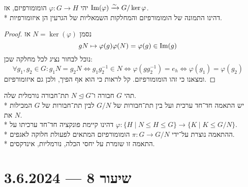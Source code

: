 \begin{theorem}
	יהי $\varphi : G \to H$ הומומורפיזם, אז $\operatorname{Im}(\varphi) \xrightarrow{\sim} G/\ker{\varphi}$. \\*
	דהינו התמונה של הומומורפיזם והמחלקות השמאליות של הגרעין הן איזומורפיות.
\end{theorem}
\begin{proof}
	נסמן $N = \ker(\varphi)$ אז
	\[
		g N \mapsto \varphi(g) \varphi(N) = \varphi(g) \in \operatorname{Im}(g)
	\]
	נוכל לבחור נציג לכל מחלקה שכן:
	\[
		\forall g_1, g_2 \in G : g_1 N = g_2 N \iff g_1 g_2^{-1} \in N \iff \varphi(g g_2^{-1}) = e_h \iff \varphi(g_1) = \varphi(g_2)
	\]
	ומצאנו כי זהו הומומורפיזם. קל לראות כי הוא אף הפיך, ולכן גם איזומורפיזם.
\end{proof}
\begin{theorem}
	תהי $G$ חבורה ו־$N \trianglelefteq G$ תת־חבורה נורמלית שלה. \\*
	יש התאמה חד־חד ערכית ועל בין תת־חבורות של $G/N$ לבין תת־חבורות של $G$ המכילות את $N$. \\*
	דהינו קיימת פונקציה חד־חד ערכיתו על $\varphi : \{ H \mid N \le H \le G \} \to \{ K \mid K \le G/N \}$. \\*
	ההתאמה נוצרת על־ידי $\pi : G \to G/N$ הומומורפיזם המתאים לפעולת חלוקה לאגפים. \\*
	התאמה זו שומרת על יחסי הכלה, נורמליות, אינדקסים.
\end{theorem}

\section{שיעור 8 --- 3.6.2024}
